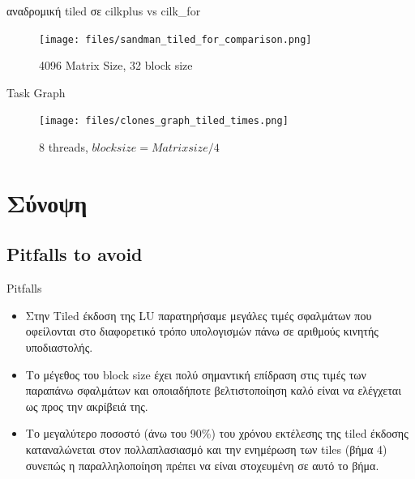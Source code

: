 \documentclass{beamer}
\begin{document}
\begin{frame}
    \begin{block}{αναδρομική tiled σε cilkplus vs cilk\_for}
        \begin{figure}[H]
            \centering
            \texttt{[image: files/sandman\_tiled\_for\_comparison.png]}
            \caption{4096 Matrix Size, 32 block size}
        \end{figure}
    \end{block}
\end{frame}

\begin{frame}
    \begin{block}{Task Graph}
        \begin{figure}[H]
            \centering
            \texttt{[image: files/clones\_graph\_tiled\_times.png]}
            \caption{8 threads, $block size = Matrix size /4$}
        \end{figure}
    \end{block}
\end{frame}

\section{Σύνοψη}

\subsection{Pitfalls to avoid}
\begin{frame}{Pitfalls}
    \begin{itemize}
            \item<1-> Στην Tiled έκδοση της LU παρατηρήσαμε μεγάλες τιμές
                σφαλμάτων που οφείλονται στο διαφορετικό τρόπο υπολογισμών
                πάνω σε αριθμούς κινητής υποδιαστολής.
            \item<2-> Το μέγεθος του block size έχει πολύ σημαντική επίδραση
                στις τιμές των παραπάνω σφαλμάτων και οποιαδήποτε
                βελτιστοποίηση καλό είναι να ελέγχεται ως προς την ακρίβειά
                της.
            \item<3-> Το μεγαλύτερο ποσοστό (άνω του 90\%) του χρόνου
                εκτέλεσης της tiled έκδοσης καταναλώνεται στον πολλαπλασιασμό
                και την ενημέρωση των tiles (βήμα 4) συνεπώς η παραλληλοποίηση
                πρέπει να είναι στοχευμένη σε αυτό το βήμα.
    \end{itemize}
\end{frame}
\end{document}
